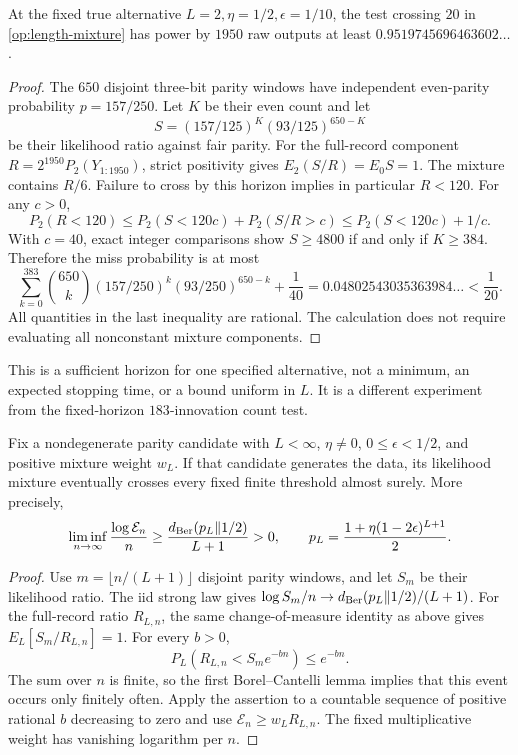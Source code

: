 \begin{proposition}\label{op:1950}
At the fixed true alternative \(L=2,\eta=1/2,\epsilon=1/10\), the test
crossing \(20\) in \eqref{op:length-mixture} has power by \(1950\)
raw outputs at least \(0.9519745696463602\ldots\).
\end{proposition}
\begin{proof}
The \(650\) disjoint three-bit parity windows have independent
even-parity probability \(p=157/250\).  Let \(K\) be their even count and
let
\[
 S=(157/125)^K(93/125)^{650-K}
\]
be their likelihood ratio against fair parity.
For the full-record component \(R=2^{1950}P_2(Y_{1:1950})\),
strict positivity gives
\(E_2(S/R)=E_0S=1\).
The mixture contains \(R/6\).  Failure to cross by this horizon implies
in particular \(R<120\).
For any \(c>0\),
\[
 P_2(R<120)\le P_2(S<120c)+P_2(S/R>c)
              \le P_2(S<120c)+1/c .
\]
With \(c=40\), exact integer comparisons show
\(S\ge4800\) if and only if \(K\ge384\).
Therefore the miss probability is at most
\[
 \sum_{k=0}^{383}\binom{650}{k}
       (157/250)^k(93/250)^{650-k}+\frac1{40}
 =0.04802543035363984\ldots<\frac1{20}.
\]
All quantities in the last inequality are rational.  The calculation
does not require evaluating all nonconstant mixture components.
\end{proof}

This is a sufficient horizon for one specified alternative, not a
minimum, an expected stopping time, or a bound uniform in \(L\).
It is a different experiment from the fixed-horizon \(183\)-innovation
count test.

\begin{theorem}\label{op:eventual}
Fix a nondegenerate parity candidate with \(L<\infty\), \(\eta\ne0\),
\(0\le\epsilon<1/2\), and positive mixture weight \(w_L\).
If that candidate generates the data, its likelihood mixture eventually
crosses every fixed finite threshold almost surely.  More precisely,
\[
 \liminf_{n\to\infty}\frac{\log\mathcal E_n}{n}
 \ge \frac{d_{\rm Ber}(p_L\Vert1/2)}{L+1}>0,\qquad
 p_L=\frac{1+\eta(1-2\epsilon)^{L+1}}2 .
\]
\end{theorem}
\begin{proof}
Use \(m=\lfloor n/(L+1)\rfloor\) disjoint parity windows, and let \(S_m\)
be their likelihood ratio.  The iid strong law gives
\(\log S_m/n\to d_{\rm Ber}(p_L\Vert1/2)/(L+1)\).
For the full-record ratio \(R_{L,n}\), the same change-of-measure
identity as above gives \(E_L[S_m/R_{L,n}]=1\).
For every \(b>0\),
\[
 P_L(R_{L,n}<S_me^{-bn})\le e^{-bn}.
\]
The sum over \(n\) is finite, so the first Borel--Cantelli lemma
implies that this event occurs only finitely often.
Apply the assertion to a countable sequence of positive rational
\(b\) decreasing to zero and use
\(\mathcal E_n\ge w_LR_{L,n}\).
The fixed multiplicative weight has vanishing logarithm per \(n\).
\end{proof}

